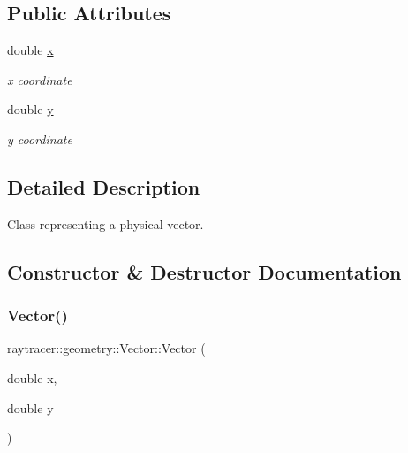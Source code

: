 \subsection*{Public Attributes}
\begin{DoxyCompactItemize}
\item 
\mbox{\label{classraytracer_1_1geometry_1_1Vector_a954a5ffca3169512b63cf6d2530d957f}} 
double \hyperlink{classraytracer_1_1geometry_1_1Vector_a954a5ffca3169512b63cf6d2530d957f}{x}
\begin{DoxyCompactList}\small\item\em x coordinate \end{DoxyCompactList}\item 
\mbox{\label{classraytracer_1_1geometry_1_1Vector_a6f94f809967bec250380eb2fa91492c2}} 
double \hyperlink{classraytracer_1_1geometry_1_1Vector_a6f94f809967bec250380eb2fa91492c2}{y}
\begin{DoxyCompactList}\small\item\em y coordinate \end{DoxyCompactList}\end{DoxyCompactItemize}


\subsection{Detailed Description}
Class representing a physical vector. 

\subsection{Constructor \& Destructor Documentation}
\mbox{\label{classraytracer_1_1geometry_1_1Vector_acd5cb78949603529e271310395459440}} 
\subsubsection{\texorpdfstring{Vector()}{Vector()}}
{\footnotesize\ttfamily raytracer\+::geometry\+::\+Vector\+::\+Vector (\begin{DoxyParamCaption}\item[{double}]{x,  }\item[{double}]{y }\end{DoxyParamCaption})}



